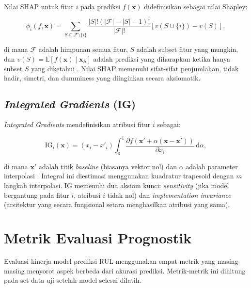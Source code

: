 Nilai SHAP untuk fitur $i$ pada prediksi $f(\mathbf{x})$ didefinisikan
sebagai nilai Shapley:

\begin{equation}\label{eq:bab3_shap}
  \phi_i(f, \mathbf{x}) = \sum_{S \subseteq \mathcal{F} \setminus \{i\}}
    \frac{|S|!(|\mathcal{F}| - |S| - 1)!}{|\mathcal{F}|!}
    \left[ v(S \cup \{i\}) - v(S) \right],
\end{equation}

\noindent di mana $\mathcal{F}$ adalah himpunan semua fitur, $S$ adalah
subset fitur yang mungkin, dan $v(S) = \mathbb{E}[f(\mathbf{x}) \mid
\mathbf{x}_S]$ adalah prediksi yang diharapkan ketika hanya subset $S$ yang
diketahui . Nilai SHAP memenuhi sifat-sifat
penjumlahan, tidak hadir, simetri, dan dumminess yang diinginkan secara
aksiomatik.

\subsection{\emph{Integrated Gradients} (IG)}
\label{subsec:bab3_ig}

\emph{Integrated Gradients} mendefinisikan atribusi fitur $i$ sebagai:

\begin{equation}\label{eq:bab3_ig}
  \text{IG}_i(\mathbf{x}) = (x_i - x'_i)
    \int_{0}^{1}
      \frac{\partial f\!\left(\mathbf{x}' + \alpha(\mathbf{x} - \mathbf{x}')\right)}
           {\partial x_i}
    \, \mathrm{d}\alpha,
\end{equation}

\noindent di mana $\mathbf{x}'$ adalah titik \emph{baseline} (biasanya vektor
nol) dan $\alpha$ adalah parameter interpolasi .
Integral ini diestimasi menggunakan kuadratur trapesoid dengan $m$ langkah
interpolasi. IG memenuhi dua aksiom kunci: \emph{sensitivity} (jika model
bergantung pada fitur $i$, atribusi $i$ tidak nol) dan
\emph{implementation invariance} (arsitektur yang secara fungsional setara
menghasilkan atribusi yang sama).

\section{Metrik Evaluasi Prognostik}
\label{sec:bab3_metrik}

Evaluasi kinerja model prediksi RUL menggunakan empat metrik yang masing-masing
menyorot aspek berbeda dari akurasi prediksi. Metrik-metrik ini dihitung pada
set data uji setelah model selesai dilatih.

